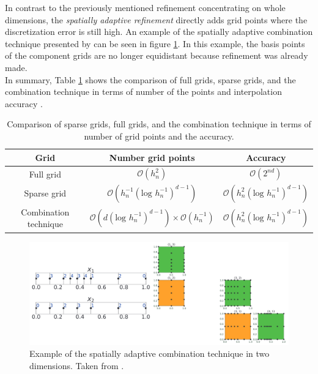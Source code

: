 In contrast to the previously mentioned refinement concentrating on whole dimensions, the \textit{spatially adaptive refinement} directly adds grid points where the discretization error is still high. An example of the spatially adaptive combination technique presented by \cite{obersteiner2021generalized} can be seen in figure \ref{fig:spatially_adaptive_combi_technique}. In this example, the basis points of the component grids are no longer equidistant because refinement was already made. 
\\

In summary, Table \ref{tab:comparison_grids} shows the comparison of full grids, sparse grids, and the combination technique in terms of number of the points and interpolation accuracy \cite{pfluger2010spatially}.


\begin{table}[H]
	\caption{ Comparison of sparse grids, full grids, and the combination technique in terms of number of grid points and the accuracy.}
	\label{tab:comparison_grids}
	\centering
	\begin{tabular}{|c c c|} 
		\hline
		Grid & Number grid points & Accuracy \\
		\hline
		Full grid & $ \mathcal{O}\left(h_n^2\right) $ & $ \mathcal{O}\left(2^{nd}\right) $ \\
		Sparse grid & $ \mathcal{O}\left(h_n^{-1}\left(\text{log } h_n^{-1}\right)^{d-1}\right) $ & $ \mathcal{O}\left(h_n^{2}\left(\text{log } h_n^{-1}\right)^{d-1}\right) $ \\
		Combination technique & $ \mathcal{O}\left(d\left(\text{log } h_n^{-1}\right)^{d-1}\right) \times  \mathcal{O}\left(h_n^{-1}\right) $ & $ \mathcal{O}\left(h_n^{2}\left(\text{log } h_n^{-1}\right)^{d-1}\right) $\\
		\hline
	\end{tabular}
\end{table}

\begin{figure}[H]
	\centering
	\includegraphics[scale=0.2]{figures/spatially_adaptive_combi_technique.png}
	\caption{ Example of the spatially adaptive combination technique in two dimensions. Taken from \cite{obersteiner2021generalized}. }
	\label{fig:spatially_adaptive_combi_technique}
\end{figure}

